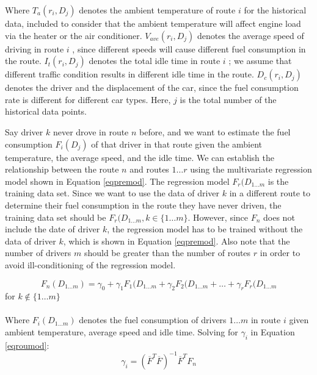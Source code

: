 Where \(T_a(r_i,D_j)\)  denotes the ambient temperature of route \(i\) for the historical data, included to consider that the ambient temperature will affect engine load via the heater or the air conditioner. \(V_{ave}(r_i,D_j)\) denotes the average speed of driving in route \(i\) , since different speeds will cause different fuel consumption in the route. \(I_{t}(r_i,D_j)\)  denotes the total idle time in route \(i\) ; we assume that different traffic condition results in different idle time in the route. \(D_{c}(r_i,D_j)\)  denotes the driver and the displacement of the car, since the fuel consumption rate is different for different car types. Here, \(j\) is the total number of the historical data points.
%

Say driver \(k\) never drove in route \(n\) before, and we want to estimate the fuel consumption \(F_i(D_j)\) of that driver in that route given the ambient temperature, the average speed, and the idle time. We can establish the relationship between the route \(n\)  and routes \(1 \ldots r\) using the multivariate regression model shown in Equation \ref{eqpremod}. The regression model \(F_r(D_{1 \ldots m}\) is the training data set. Since we want to use the data of driver \(k\) in a different route to determine their fuel consumption in the route they have never driven, the training data set should be \(F_r(D_{1 \ldots m}, k \in \{1 \ldots m\}\). However, since \(F_n\)  does not include the date of driver \(k\), the regression model has to be trained without the data of driver \(k\), which is shown in Equation \ref{eqpremod}. Also note that the number of drivers \(m\) should be greater than the number of routes \(r\) in order to avoid ill-conditioning of the regression model.

\begin{equation}
F_n(D_{1 \ldots m}) = \gamma_0 + \gamma_1F_1(D_{1 \ldots m} + \gamma_2F_2(D_{1 \ldots m} + \ldots +  \gamma_rF_r(D_{1 \ldots m}
\label{eqpremod}
\end{equation}
for \(k \notin \{1 \ldots m\}\)
\\\\
Where \(F_i(D_{1 \ldots m})\) denotes the fuel consumption of drivers \(1 \ldots m\)  in route \(i\) given ambient temperature, average speed and idle time.
Solving for \(\gamma_i\)  in Equation \ref{eqroumod}:
\begin{equation}
\gamma_i = (\overline{F}^T \overline{F})^{-1}\overline{F}^T F_n
\label{eqgammod}
\end{equation}

